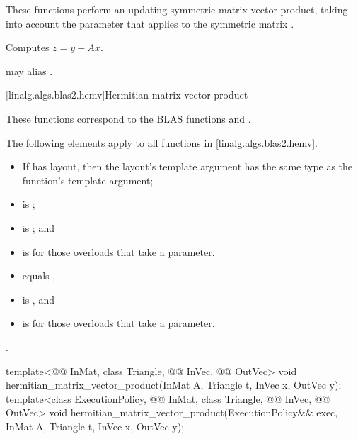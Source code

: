 \begin{itemdescr}
\pnum
These functions perform an updating symmetric matrix-vector product,
taking into account the  parameter
that applies to the symmetric matrix .

\pnum
\effects
Computes $z = y + A x$.

\pnum
\remarks
{} may alias .
\end{itemdescr}

[linalg.algs.blas2.hemv]{Hermitian matrix-vector product}

\pnum
\begin{note}
These functions correspond to the BLAS functions
 and \supercite{blas2}.
\end{note}

\pnum
The following elements apply to all functions in \ref{linalg.algs.blas2.hemv}.

\pnum
\mandates
\begin{itemize}
\item
If  has  layout,
then the layout's  template argument
has the same type as the function's  template argument;
\item
{}
is ;
\item
{}
is ; and
\item
{}
is  for those overloads that take a  parameter.
\end{itemize}

\pnum
\expects
\begin{itemize}
\item
{} equals ,
\item
{} is , and
\item
{} is  for those overloads that take a  parameter.
\end{itemize}

\pnum
\complexity
{}.

%
\begin{itemdecl}
template<@@ InMat, class Triangle, @@ InVec, @@ OutVec>
  void hermitian_matrix_vector_product(InMat A, Triangle t, InVec x, OutVec y);
template<class ExecutionPolicy,
         @@ InMat, class Triangle, @@ InVec, @@ OutVec>
  void hermitian_matrix_vector_product(ExecutionPolicy&& exec,
                                       InMat A, Triangle t, InVec x, OutVec y);
\end{itemdecl}

